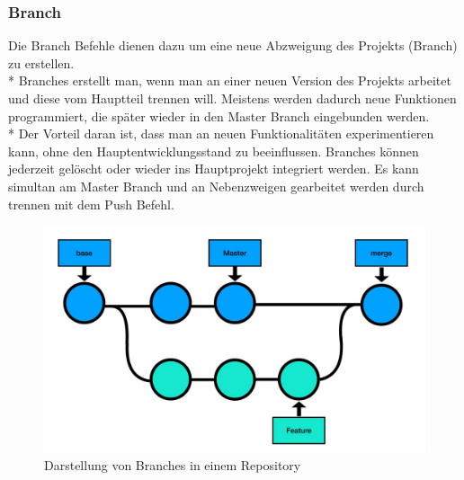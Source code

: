 \subsubsection{Branch}
\label{sec:Branch}
Die Branch Befehle dienen dazu um eine neue Abzweigung des Projekts (Branch) zu erstellen.
\\*
Branches erstellt man, wenn man an einer neuen Version des Projekts arbeitet und diese vom Hauptteil trennen will.
Meistens werden dadurch neue Funktionen programmiert, die später wieder in den Master Branch eingebunden werden.
\\* Der Vorteil daran ist, dass man an neuen Funktionalitäten experimentieren kann, ohne den Hauptentwicklungsstand zu 
beeinflussen. Branches können jederzeit gelöscht oder wieder ins Hauptprojekt integriert werden.
Es kann simultan am Master Branch und an Nebenzweigen gearbeitet werden durch trennen mit dem Push Befehl. \cite{GitExpl}

\begin{figure}[htp]
    \author{David Ignjatovic}
    \centering
    \includegraphics[scale=0.3]{pics/GitBranches.jpg}
    \caption{Darstellung von Branches in einem Repository}
    \label{fig:impl:GitBranches}
\end{figure}

